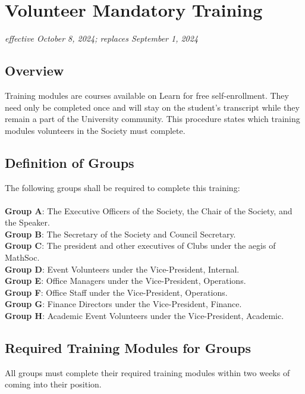 \section{Volunteer Mandatory Training}
\emph{effective October 8, 2024; replaces September 1, 2024}\\

\subsection{Overview}

Training modules are courses available on Learn for free self-enrollment. They need only be
completed once and will stay on the student's transcript while they remain a part of the
University community. This procedure states which training modules volunteers in the
Society must complete.

\subsection{Definition of Groups}

The following groups shall be required to complete this training: \\
\\ \textbf{Group A}: The Executive Officers of the Society, the Chair of the Society, and the Speaker.
\\ \textbf{Group B}: The Secretary of the Society and Council Secretary.
\\ \textbf{Group C}: The president and other executives of Clubs under the aegis of MathSoc.
\\ \textbf{Group D}: Event Volunteers under the Vice-President, Internal.
\\ \textbf{Group E}: Office Managers under the Vice-President, Operations.
\\ \textbf{Group F}: Office Staff under the Vice-President, Operations.
\\ \textbf{Group G}: Finance Directors under the Vice-President, Finance.
\\ \textbf{Group H}: Academic Event Volunteers under the Vice-President, Academic.

\subsection{Required Training Modules for Groups}

All groups must complete their required training modules within two weeks of coming into their
position.

